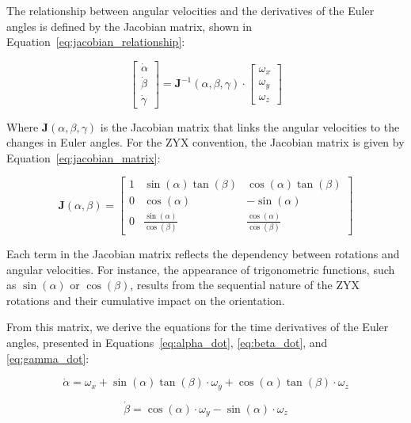 \documentclass[12pt]{article}
\begin{document}
The relationship between angular velocities and the derivatives of the Euler angles is defined by the Jacobian matrix, shown in Equation~\eqref{eq:jacobian_relationship}:

\begin{equation}
\label{eq:jacobian_relationship}
\begin{bmatrix}
\dot{\alpha} \\
\dot{\beta} \\
\dot{\gamma}
\end{bmatrix} = 
\mathbf{J}^{-1}(\alpha, \beta, \gamma) \cdot 
\begin{bmatrix}
\omega_x \\
\omega_y \\
\omega_z
\end{bmatrix}
\end{equation}

Where \( \mathbf{J}(\alpha, \beta, \gamma) \) is the Jacobian matrix that links the angular velocities to the changes in Euler angles. For the ZYX convention, the Jacobian matrix is given by Equation~\eqref{eq:jacobian_matrix}:

\begin{equation}
\label{eq:jacobian_matrix}
\mathbf{J}(\alpha, \beta) =
\begin{bmatrix}
1 & \sin(\alpha) \tan(\beta) & \cos(\alpha) \tan(\beta) \\
0 & \cos(\alpha) & -\sin(\alpha) \\
0 & \frac{\sin(\alpha)}{\cos(\beta)} & \frac{\cos(\alpha)}{\cos(\beta)}
\end{bmatrix}
\end{equation}

Each term in the Jacobian matrix reflects the dependency between rotations and angular velocities. For instance, the appearance of trigonometric functions, such as \(\sin(\alpha)\) or \(\cos(\beta)\), results from the sequential nature of the ZYX rotations and their cumulative impact on the orientation.

From this matrix, we derive the equations for the time derivatives of the Euler angles, presented in Equations~\eqref{eq:alpha_dot}, \eqref{eq:beta_dot}, and \eqref{eq:gamma_dot}:

\begin{equation}
\label{eq:alpha_dot}
\dot{\alpha} = \omega_x + \sin(\alpha) \tan(\beta) \cdot \omega_y + \cos(\alpha) \tan(\beta) \cdot \omega_z
\end{equation}

\begin{equation}
\label{eq:beta_dot}
\dot{\beta} = \cos(\alpha) \cdot \omega_y - \sin(\alpha) \cdot \omega_z
\end{equation}
\end{document}
